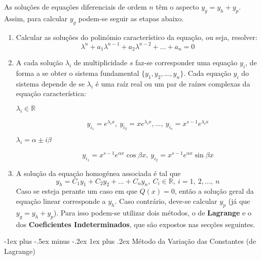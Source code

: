 \documentclass[10pt,landscape]{article}
\makeatletter
\newcommand{\RNum}[1]{\uppercase\expandafter{\romannumeral #1\relax}}
\renewcommand{\subsubsection}{\@startsection{subsubsection}{3}{0mm}%
                                {-1ex plus -.5ex minus -.2ex}%
                                {1ex plus .2ex}%
                                {\normalfont\small\bfseries}}
\makeatother
\begin{document}
\begin{multicols}{3}
As soluções de equações diferenciais de ordem $n$ têm o aspecto $y_g = y_h + y_p$. Assim, para calcular $y_g$ podem-se seguir as etapas abaixo.
\begin{enumerate}
\item Calcular as soluções do polinómio característico da equação, ou seja, resolver:
$$\lambda^n + a_1 \lambda^{n-1} + a_2 \lambda^{n-2} + ... + a_n = 0$$
\item A cada solução $\lambda_i$ de multiplicidade $s$ faz-se corresponder uma equação $y_i$, de forma a se obter o sistema fundamental $\{y_1, y_2, ..., y_n\}$. Cada equação $y_i$ do sistema depende de se $\lambda_i$ é uma raíz real ou um par de raízes complexas da equação característica:
\begin{description}
\item[$\lambda_i \in \mathbb{R}$]
$$y_{i_1} = e^{\lambda_i x},\ y_{i_2} = x e^{\lambda_i x}, ...,\ y_{i_s} = x^{s-1} e^{\lambda_i x}$$
\item[$\lambda_i = \alpha \pm i \beta$]
$$y_{i_1} = x^{s-1} e^{\alpha x} \cos{\beta x},\ y_{i_2} = x^{s-1} e^{\alpha x} \sin{\beta x}$$
\end{description}
\item A solução da equação homogénea associada é tal que
$$y_h = C_1 y_1 + C_2 y_2 + ... + C_n y_n,\ C_i \in \mathbb{R},\ i = 1,\ 2, ...,\ n$$
Caso se esteja perante um caso em que $Q(x) = 0$, então a solução geral da equação linear corresponde a $y_h$. Caso contrário, deve-se calcular $y_p$ (já que $y_g = y_h + y_p$). Para isso podem-se utilizar dois métodos, o de \textbf{Lagrange} e o dos \textbf{Coeficientes Indeterminados}, que são expostos nas secções seguintes.
\end{enumerate}

\subsubsection{\texorpdfstring{\RNum{1}}{TEXT} Método da Variação das Constantes (de Lagrange)}


\end{multicols}
\end{document}
